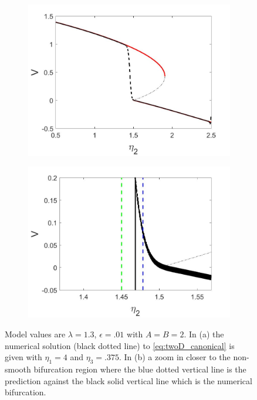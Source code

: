 \begin{figure}[H]
\centering
\begin{subfigure}{.5\textwidth}
  \centering
  \includegraphics[width=\linewidth]{twoD/slowosc_bif_diagram_medium.jpg}
  \caption{}
\end{subfigure}%
\begin{subfigure}{.5\textwidth}
  \centering
  \includegraphics[width=\linewidth]{twoD/slowosc_bif_diagram_medium_zoom.jpg}
  \caption{}
\end{subfigure}
\caption{Model values are $\lambda=1.3$, $\epsilon=.01$ with $A=B=2$. In (a) the numerical solution (black dotted line) to \eqref{eq:twoD_canonical} is given with $\eta_1=4$ and $\eta_3=.375$. In (b) a zoom in closer to the non-smooth bifurcation region where the blue dotted vertical line is the prediction against the black solid vertical line which is the numerical bifurcation.}
\label{fig:twoD_slowosc_Vnumerics_medium}
\end{figure}

